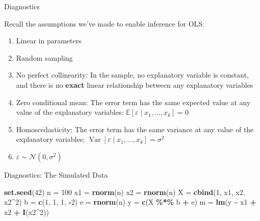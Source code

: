 \documentclass[
  ignorenonframetext,
]{beamer}
\newenvironment{Shaded}{\begin{snugshade}}{\end{snugshade}}
\newcommand{\DecValTok}[1]{\textcolor[rgb]{0.00,0.00,0.81}{#1}}
\newcommand{\FunctionTok}[1]{\textcolor[rgb]{0.13,0.29,0.53}{\textbf{#1}}}
\newcommand{\NormalTok}[1]{#1}
\newcommand{\OtherTok}[1]{\textcolor[rgb]{0.56,0.35,0.01}{#1}}
\newcommand{\SpecialCharTok}[1]{\textcolor[rgb]{0.81,0.36,0.00}{\textbf{#1}}}
\providecommand{\tightlist}{%
  \setlength{\itemsep}{0pt}\setlength{\parskip}{0pt}}
\newcommand{\setsep}{\setlength{\itemsep}{3pt}}
\newcommand{\setskip}{\setlength{\parskip}{3pt}}
\renewcommand{\tightlist}{\setsep\setskip}
\begin{document}
\begin{frame}{Diagnostics}
\protect\hypertarget{diagnostics}{}
\pause

Recall the assumptions we've made to enable inference for OLS:

\begin{enumerate}
\tightlist
\item
  Linear in parameters
\item
  Random sampling
\item
  No perfect collinearity: In the sample, no explanatory variable is constant, and there is no \textbf{exact} linear relationship between any explanatory variables
\item
  Zero conditional mean: The error term has the same expected value at any value of the explanatory variables: \(\ensuremath{\mathbb{E}\left[\varepsilon \mid x_1, \dots, x_k\right]} = 0\)
\item
  Homoscedasticity: The error term has the same variance at any value of the explanatory variables; \(\ensuremath{\mathop{\mathrm{Var}}\left[\varepsilon \mid x_1, \dots, x_k\right]} = \sigma^2\)
\item
  \(\varepsilon \sim \mathcal{N}\left( 0, \sigma^2 \right)\)
\end{enumerate}
\end{frame}

\begin{frame}[fragile]{Diagnostics: The Simulated Data}
\protect\hypertarget{diagnostics-the-simulated-data}{}
\begin{Shaded}
\begin{Highlighting}[]
\FunctionTok{set.seed}\NormalTok{(}\DecValTok{42}\NormalTok{)}
\NormalTok{n  }\OtherTok{=} \DecValTok{100}
\NormalTok{x1 }\OtherTok{=} \FunctionTok{rnorm}\NormalTok{(n)}
\NormalTok{x2 }\OtherTok{=} \FunctionTok{rnorm}\NormalTok{(n)}
\NormalTok{X  }\OtherTok{=} \FunctionTok{cbind}\NormalTok{(}\DecValTok{1}\NormalTok{, x1, x2, x2}\SpecialCharTok{\^{}}\DecValTok{2}\NormalTok{)}
\NormalTok{b  }\OtherTok{=} \FunctionTok{c}\NormalTok{(}\DecValTok{1}\NormalTok{, }\DecValTok{1}\NormalTok{, }\DecValTok{1}\NormalTok{, }\SpecialCharTok{{-}}\DecValTok{2}\NormalTok{)}
\NormalTok{e  }\OtherTok{=} \FunctionTok{rnorm}\NormalTok{(n)}
\NormalTok{y  }\OtherTok{=} \FunctionTok{c}\NormalTok{(X }\SpecialCharTok{\%*\%}\NormalTok{ b }\SpecialCharTok{+}\NormalTok{ e)}
\NormalTok{m  }\OtherTok{=} \FunctionTok{lm}\NormalTok{(y }\SpecialCharTok{\textasciitilde{}}\NormalTok{ x1 }\SpecialCharTok{+}\NormalTok{ x2 }\SpecialCharTok{+} \FunctionTok{I}\NormalTok{(x2}\SpecialCharTok{\^{}}\DecValTok{2}\NormalTok{))}
\end{Highlighting}
\end{Shaded}
\end{frame}
\end{document}
